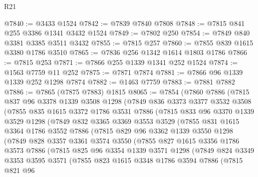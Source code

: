 \begin{lexlean}{R21}
\begin{coremodule}
@7840 := @3433 @1524
@7842 := @7839 @7840 @7808
@7848 := @7815 @841 @255 @3386 @1341 @3432 @1524
@7849 := @7802 @250
@7854 := @7849 @840 @3381 @3385 @3511 @3432
@7855 := @7815 @257
@7860 := @7855 @839 @1615 @3380 @1786 @3510
@7865 := @7836 @256 @1342 @1614 @1803 @1786
@7866 := @7815 @253
@7871 := @7866 @255 @1339 @1341 @252 @1524
@7874 := @1563 @7759 @11 @252
@7875 := @7871 @7874
@7881 := @7866 @96 @1339 @1339 @252 @1298 @7874
@7882 := @1463 @7759
@7883 := @7881 @7882
@7886 := @7865 (@7875 @7883) @1815
@8065 := @7854
    (@7860
      @7886
      (@7815
        @837
        @96
        @3378
        @1339
        @3508
        @1298
        (@7849
          @836
          @3373
          @3377
          @3532
          @3508
          (@7855
            @835
            @1615
            @3372
            @1786
            @3531
            @7886
            (@7815
              @833
              @96
              @3370
              @1339
              @3529
              @1298
              (@7849
                @832
                @3365
                @3369
                @3553
                @3529
                (@7855
                  @831
                  @1615
                  @3364
                  @1786
                  @3552
                  @7886
                  (@7815
                    @829
                    @96
                    @3362
                    @1339
                    @3550
                    @1298
                    (@7849
                      @828
                      @3357
                      @3361
                      @3574
                      @3550
                      (@7855
                        @827
                        @1615
                        @3356
                        @1786
                        @3573
                        @7886
                        (@7815
                          @825
                          @96
                          @3354
                          @1339
                          @3571
                          @1298
                          (@7849
                            @824
                            @3349
                            @3353
                            @3595
                            @3571
                            (@7855
                              @823
                              @1615
                              @3348
                              @1786
                              @3594
                              @7886
                              (@7815
                                @821
                                @96

\end{coremodule}
\end{lexlean}
